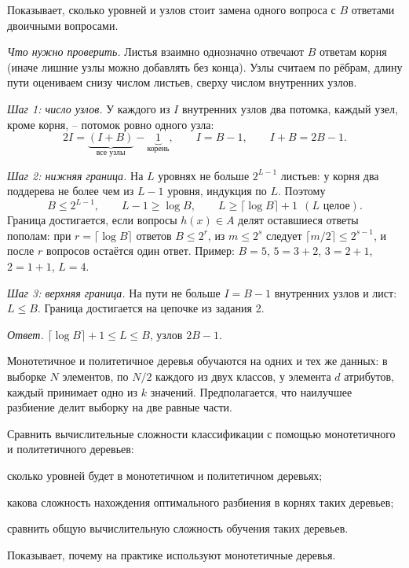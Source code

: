 \documentclass[12pt,a4paper]{article}
\begin{document}
\zachem Показывает, сколько уровней и узлов стоит замена одного вопроса с $B$
ответами двоичными вопросами.

\resh \emph{Что нужно проверить.} Листья взаимно однозначно отвечают $B$ ответам
корня (иначе лишние узлы можно добавлять без конца). Узлы считаем по рёбрам, длину
пути оцениваем снизу числом листьев, сверху числом внутренних узлов.

\emph{Шаг 1: число узлов.} У каждого из $I$ внутренних узлов два потомка, каждый узел,
кроме корня, -- потомок ровно одного узла:
\[
  2I = \underbrace{(I + B)}_{\text{все узлы}} - \underbrace{1}_{\text{корень}},
  \qquad
  I = B - 1,
  \qquad
  I + B = 2B - 1 .
\]

\emph{Шаг 2: нижняя граница.} На $L$ уровнях не больше $2^{L-1}$ листьев: у корня два
поддерева не более чем из $L - 1$ уровня, индукция по $L$. Поэтому
\[
  B \le 2^{L-1},
  \qquad
  L - 1 \ge \log B,
  \qquad
  L \ge \lceil\log B\rceil + 1 \ \ (L \text{ целое}) .
\]
Граница достигается, если вопросы $h(x) \in A$ делят оставшиеся ответы пополам: при
$r = \lceil\log B\rceil$ ответов $B \le 2^r$, из $m \le 2^s$ следует
$\lceil m/2\rceil \le 2^{s-1}$, и после $r$ вопросов остаётся один ответ. Пример:
$B = 5$, $5 = 3 + 2$, $3 = 2 + 1$, $2 = 1 + 1$, $L = 4$.

\emph{Шаг 3: верхняя граница.} На пути не больше $I = B - 1$ внутренних узлов и лист:
$L \le B$. Граница достигается на цепочке из задания 2.

\emph{Ответ.} $\lceil\log B\rceil + 1 \le L \le B$, узлов $2B - 1$.

\dano Монотетичное и политетичное деревья обучаются на одних и тех же данных: в
выборке $N$ элементов, по $N/2$ каждого из двух классов, у элемента $d$ атрибутов,
каждый принимает одно из $k$ значений. Предполагается, что наилучшее разбиение
делит выборку на две равные части.

\treb Сравнить вычислительные сложности классификации с помощью монотетичного и
политетичного деревьев:
\begin{ruslist}
  \item[(а)] сколько уровней будет в монотетичном и политетичном деревьях;
  \item[(б)] какова сложность нахождения оптимального разбиения в корнях таких
    деревьев;
  \item[(в)] сравнить общую вычислительную сложность обучения таких деревьев.
\end{ruslist}

\zachem Показывает, почему на практике используют монотетичные деревья.
\end{document}
